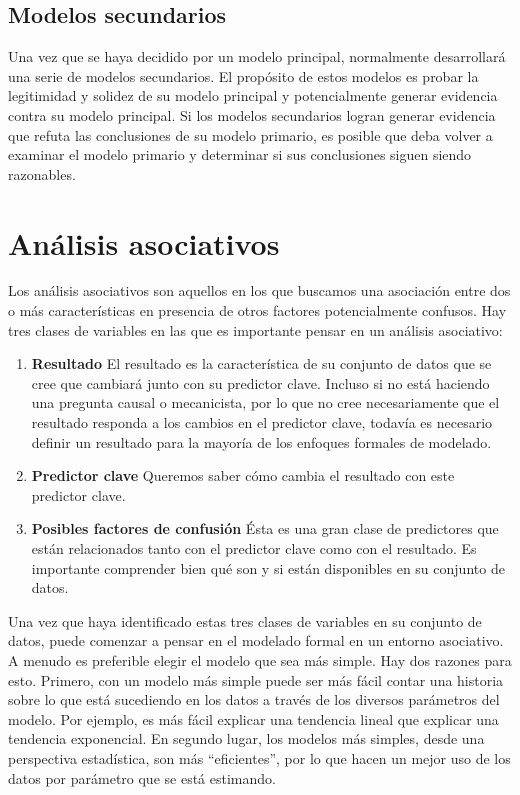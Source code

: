 \documentclass[10pt]{book}
\begin{document}
	\subsection{Modelos secundarios}
	Una vez que se haya decidido por un modelo principal, normalmente desarrollará una serie de modelos secundarios. El propósito de estos modelos es probar la legitimidad y solidez de su modelo principal y potencialmente generar evidencia contra su modelo principal. Si los modelos secundarios logran generar evidencia que refuta las conclusiones de su modelo primario, es posible que deba volver a examinar el modelo primario y determinar si sus conclusiones siguen siendo razonables.
    \section{Análisis asociativos}
    Los análisis asociativos son aquellos en los que buscamos una asociación entre dos o más características en presencia de otros factores potencialmente confusos. Hay tres clases de variables en las que es importante pensar en un análisis asociativo:
    \begin{enumerate}[\bfseries 1.]
	\item \textbf{Resultado} El resultado es la característica de su conjunto de datos que se cree que cambiará junto con su predictor clave. Incluso si no está haciendo una pregunta causal o mecanicista, por lo que no cree necesariamente que el resultado responda a los cambios en el predictor clave, todavía es necesario definir un resultado para la mayoría de los enfoques formales de modelado.
	\item \textbf{Predictor clave} Queremos saber cómo cambia el resultado con este predictor clave.
	\item \textbf{Posibles factores de confusión} Ésta es una gran clase de predictores que están relacionados tanto con el predictor clave como con el resultado. Es importante comprender bien qué son y si están disponibles en su conjunto de datos.
    \end{enumerate}
    Una vez que haya identificado estas tres clases de variables en su conjunto de datos, puede comenzar a pensar en el modelado formal en un entorno asociativo.\\
    A menudo es preferible elegir el modelo que sea más simple. Hay dos razones para esto. Primero, con un modelo más simple puede ser más fácil contar una historia sobre lo que está sucediendo en los datos a través de los diversos parámetros del modelo. Por ejemplo, es más fácil explicar una tendencia lineal que explicar una tendencia exponencial. En segundo lugar, los modelos más simples, desde una perspectiva estadística, son más “eficientes”, por lo que hacen un mejor uso de los datos por parámetro que se está estimando.
\end{document}
